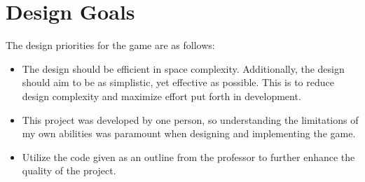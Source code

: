 \section{Design Goals}
\label{sec:DesignGoals}

The design priorities for the game are as follows:
\begin{itemize}
    \item The design should be efficient in space complexity.
    Additionally, the design should aim to be as simplistic, yet effective as possible.
    This is to reduce design complexity and maximize effort put forth in development.
    \item This project was developed by one person, so understanding the limitations of my own abilities was paramount when designing and implementing the game.
    \item Utilize the code given as an outline from the professor to further enhance the quality of the project.
\end{itemize}

